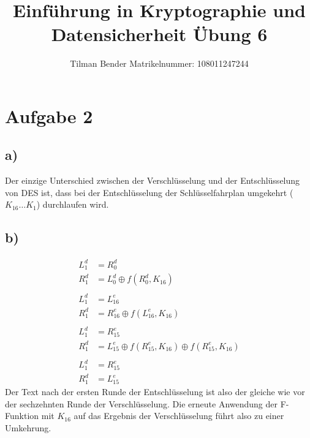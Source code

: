 \documentclass[10pt,a4paper]{article}
\author{Tilman Bender   Matrikelnummer: 108011247244\\}
\title{Einführung in Kryptographie und Datensicherheit Übung 6}
\begin{document}
\maketitle

\section*{Aufgabe 2}
\subsection*{a)}
Der einzige Unterschied zwischen der Verschlüsselung und der Entschlüsselung von DES ist, dass bei der Entschlüsselung der Schlüsselfahrplan umgekehrt ($K_{16} \dots K_{1}$) durchlaufen wird.

\subsection*{b)}
\begin{align*}
L_{1}^{d}&=R_{0}^{d}\\
R_{1}^{d}&=L_{0}^{d} \oplus f(R_{0}^{d},K_{16})\\
\\
L_{1}^{d}&=L_{16}^{e}\\
R_{1}^{d}&=R_{16}^{e} \oplus f(L_{16}^{e},K_{16})\\
\\
L_{1}^{d}&=R_{15}^{e}\\
R_{1}^{d}&=L_{15}^{e} \oplus f(R_{15}^{e},K_{16})  \oplus f(R_{15}^{e},K_{16})\\
\\
L_{1}^{d}&=R_{15}^{e}\\
R_{1}^{d}&=L_{15}^{e}
\end{align*}
Der Text nach der ersten Runde der Entschlüsselung  ist also der gleiche wie vor der sechzehnten Runde der Verschlüsselung.
Die erneute Anwendung der F-Funktion mit $K_{16}$ auf das Ergebnis der Verschlüsselung führt also zu einer Umkehrung.
\end{document}
